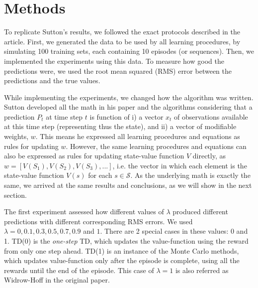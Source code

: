 \documentclass{article}
\begin{document}
\section{Methods}
\label{sec:methods}
To replicate Sutton's results, we followed the exact protocols described in the article.
First, we generated the data to be used by all learning procedures, by simulating 100 training sets, each containing 10 episodes (or sequences).
Then, we implemented the experiments using this data.
To measure how good the predictions were, we used the root mean squared (RMS) error between the predictions and the true values.

While implementing the experiments, we changed how the algorithm was written.
Sutton developed all the math in his paper and the algorithms considering that a prediction $P_{t}$ at time step $t$ is function of i) a vector $x_{t}$ of observations available at this time step (representing thus the state), and ii) a vector of modifiable weights, $w$.
This means he expressed all learning procedures and equations as rules for updating $w$.
However, the same learning procedures and equations can also be expressed as rules for updating state-value function $V$ directly, as $w = [V(S_{1}), V(S_{2}), V(S_{3}), ...]$, i.e. the vector in which each element is the state-value function $V(s)$ for each $s \in \mathcal{S}$.
As the underlying math is exactly the same, we arrived at the same results and conclusions, as we will show in the next section.

The first experiment assessed how different values of $\lambda$ produced different predictions with different corresponding RMS errors.
We used $\lambda = 0, 0.1, 0.3, 0.5, 0.7, 0.9$ and $1$.
There are 2 special cases in these values: 0 and 1.
TD(0) is the \emph{one-step} TD, which updates the value-function using the reward from only one step ahead.
TD(1) is an instance of the Monte Carlo methods, which updates value-function only after the episode is complete, using all the rewards until the end of the episode.
This case of $\lambda = 1$ is also referred as Widrow-Hoff in the original paper.
\end{document}
